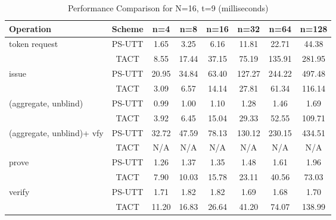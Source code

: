 \begin{table}[htbp]
\centering
\caption{Performance Comparison for N=16, t=9 (milliseconds)}
\begin{tabular}{lccccccc}
\toprule
\textbf{Operation} & \textbf{Scheme} & \textbf{n=4} & \textbf{n=8} & \textbf{n=16} & \textbf{n=32} & \textbf{n=64} & \textbf{n=128} \\
\midrule
token request & PS-UTT & 1.65 & 3.25 & 6.16 & 11.81 & 22.71 & 44.38 \\
 & TACT & 8.55 & 17.44 & 37.15 & 75.19 & 135.91 & 281.95 \\
\midrule
issue & PS-UTT & 20.95 & 34.84 & 63.40 & 127.27 & 244.22 & 497.48 \\
 & TACT & 3.09 & 6.57 & 14.14 & 27.81 & 61.34 & 116.14 \\
\midrule
(aggregate, unblind) & PS-UTT & 0.99 & 1.00 & 1.10 & 1.28 & 1.46 & 1.69 \\
 & TACT & 3.92 & 6.45 & 15.04 & 29.33 & 52.55 & 109.71 \\
\midrule
(aggregate, unblind)+ vfy & PS-UTT & 32.72 & 47.59 & 78.13 & 130.12 & 230.15 & 434.51 \\
 & TACT & N/A & N/A & N/A & N/A & N/A & N/A \\
\midrule
prove & PS-UTT & 1.26 & 1.37 & 1.35 & 1.48 & 1.61 & 1.96 \\
 & TACT & 7.90 & 10.03 & 15.78 & 23.11 & 40.56 & 73.03 \\
\midrule
verify & PS-UTT & 1.71 & 1.82 & 1.82 & 1.69 & 1.68 & 1.70 \\
 & TACT & 11.20 & 16.83 & 26.64 & 41.20 & 74.07 & 138.99 \\
\bottomrule
\end{tabular}
\label{tab:perf-comp-16-9}
\end{table}


